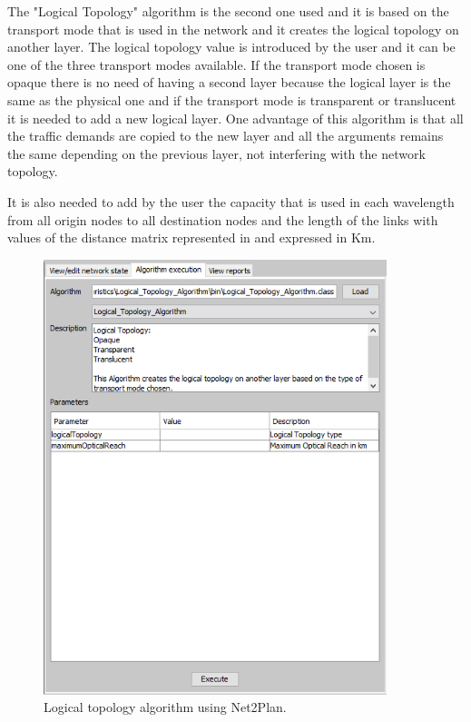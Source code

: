 \vspace{11pt}
The "Logical Topology" algorithm is the second one used and it is based on the transport mode that is used in the network and it creates the logical topology on another layer. The logical topology value is introduced by the user and it can be one of the three transport modes available. If the transport mode chosen is opaque there is no need of having a second layer because the logical layer is the same as the physical one and if the transport mode is transparent or translucent it is needed to add a new logical layer. One advantage of this algorithm is that all the traffic demands are copied to the new layer and all the arguments remains the same depending on the previous layer, not interfering with the network topology.

It is also needed to add by the user the capacity that is used in each wavelength from all origin nodes to all destination nodes and the length of the links with values of the distance matrix represented in \label{Reference_Network_Topology} and expressed in Km.

\begin{figure}[h!]
\centering
\includegraphics[width=10cm]{sdf/heuristic/figures/logical_topology}
\caption{Logical topology algorithm using Net2Plan.}
\label{logical_topology}
\end{figure}

